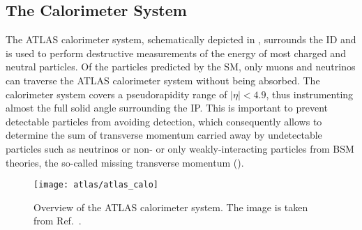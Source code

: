 \subsection{The Calorimeter System}%
\label{sec:atlas_calorimeters}


The ATLAS calorimeter system, schematically depicted in
, surrounds the ID and is used to perform
destructive measurements of the energy of most charged and neutral particles. Of
the particles predicted by the SM, only muons and neutrinos can traverse the
ATLAS calorimeter system without being absorbed. The calorimeter system covers a
pseudorapidity range of $|\eta| < 4.9$, thus instrumenting almost the full solid
angle surrounding the IP. This is important to prevent detectable particles from
avoiding detection, which consequently allows to determine the sum of transverse
momentum carried away by undetectable particles such as neutrinos or non- or
only weakly-interacting particles from BSM theories, the so-called missing
transverse momentum ().


\begin{figure}[htbp]
  \centering

  \texttt{[image: atlas/atlas\_calo]}

  \caption{Overview of the ATLAS calorimeter system. The image is taken from
    Ref.~\cite{PERF-2007-01}.}%
  \label{fig:atlas_calorimeters}
\end{figure}

